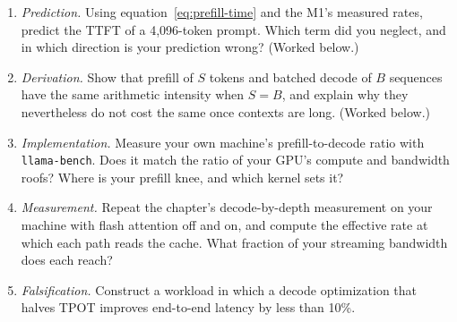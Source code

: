 \begin{enumerate}
\item \emph{Prediction.} Using equation~\eqref{eq:prefill-time} and the M1's
measured rates, predict the TTFT of a 4,096-token prompt. Which term did you
neglect, and in which direction is your prediction wrong? (Worked below.)
\item \emph{Derivation.} Show that prefill of $S$ tokens and batched decode of
$B$ sequences have the same arithmetic intensity when $S=B$, and explain why
they nevertheless do not cost the same once contexts are long. (Worked below.)
\item \emph{Implementation.} Measure your own machine's prefill-to-decode
ratio with \texttt{llama-bench}. Does it match the ratio of your GPU's compute
and bandwidth roofs? Where is your prefill knee, and which kernel sets it?
\item \emph{Measurement.} Repeat the chapter's decode-by-depth measurement on
your machine with flash attention off and on, and compute the effective rate
at which each path reads the cache. What fraction of your streaming bandwidth
does each reach?
\item \emph{Falsification.} Construct a workload in which a decode
optimization that halves TPOT improves end-to-end latency by less than 10\%.
\end{enumerate}


